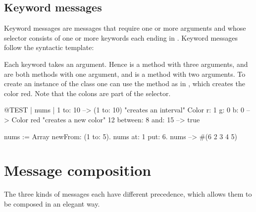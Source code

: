 \documentclass[a4paper,10pt,twoside]{book}
\begin{document}

\subsection{Keyword messages} 

Keyword messages are messages that require one or more arguments and whose selector consists of one or more keywords each ending in \ct{:}.
Keyword messages follow the syntactic template:

Each keyword takes an argument.
Hence  is a method with three arguments,  and  are both methods with one argument, and  is a method with two arguments.
To create an instance of the class  one can use the method  as in , which creates the color red.
Note that the colons are part of the selector.


\begin{code}{@TEST | nums |}
1 to: 10                        --> (1 to: 10)  "creates an interval"
Color r: 1 g: 0 b: 0       --> Color red  "creates a new color"
12 between: 8 and: 15 --> true

nums := Array newFrom: (1 to: 5).
nums at: 1 put: 6.
nums --> #(6 2 3 4 5)
\end{code}


\section{Message composition}
The three kinds of messages each have different precedence, which allows them to be composed in an elegant way. 
\end{document}
